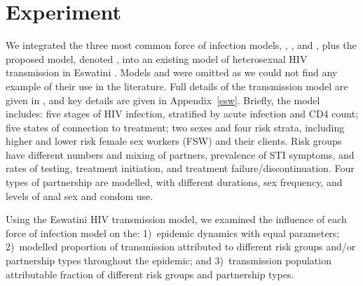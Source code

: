 \section{Experiment}\label{exp}
We integrated the three most common force of infection models, , , and ,
plus the proposed model, denoted ,
into an existing model of heterosexual HIV transmission in Eswatini \cite{TBD}.
 Models  and  were omitted
 as we could not find any example of their use in the literature.
Full details of the transmission model are given in \cite{TBD},
and key details are given in Appendix~\ref{esw}.
Briefly, the model includes:
five stages of HIV infection, stratified by acute infection and CD4 count;
five states of connection to treatment;
two sexes and four risk strata, including
higher and lower risk female sex workers (FSW) and their clients.
Risk groups have different numbers and mixing of partners, prevalence of STI symptoms,
and rates of testing, treatment initiation, and treatment failure/discontinuation.
Four types of partnership are modelled, with different
durations, sex frequency, and levels of anal sex and condom use.
\par
Using the Eswatini HIV transmission model, 
we examined the influence of each force of infection model on the:
1)~epidemic dynamics with equal parameters;
2)~modelled proportion of transmission attributed to
different risk groups and/or partnership types throughout the epidemic; and
3)~transmission population attributable fraction \cite{Mishra2014}
of different risk groups and partnership types.
